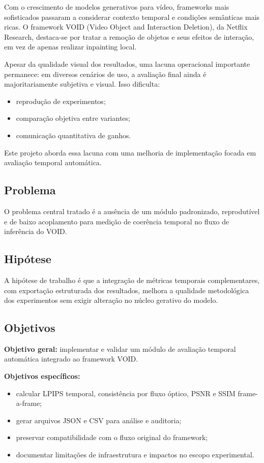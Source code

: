 \documentclass[conference]{IEEEtran}
\begin{document}
Com o crescimento de modelos generativos para vídeo, frameworks mais sofisticados passaram a considerar contexto temporal e condições semânticas mais ricas. O framework VOID (Video Object and Interaction Deletion), da Netflix Research, destaca-se por tratar a remoção de objetos e seus efeitos de interação, em vez de apenas realizar inpainting local.

Apesar da qualidade visual dos resultados, uma lacuna operacional importante permanece: em diversos cenários de uso, a avaliação final ainda é majoritariamente subjetiva e visual. Isso dificulta:
\begin{itemize}
    \item reprodução de experimentos;
    \item comparação objetiva entre variantes;
    \item comunicação quantitativa de ganhos.
\end{itemize}

Este projeto aborda essa lacuna com uma melhoria de implementação focada em avaliação temporal automática.

\subsection{Problema}
O problema central tratado é a ausência de um módulo padronizado, reprodutível e de baixo acoplamento para medição de coerência temporal no fluxo de inferência do VOID.

\subsection{Hipótese}
A hipótese de trabalho é que a integração de métricas temporais complementares, com exportação estruturada dos resultados, melhora a qualidade metodológica dos experimentos sem exigir alteração no núcleo gerativo do modelo.

\subsection{Objetivos}
\textbf{Objetivo geral:}
implementar e validar um módulo de avaliação temporal automática integrado ao framework VOID.

\textbf{Objetivos específicos:}
\begin{itemize}
    \item calcular LPIPS temporal, consistência por fluxo óptico, PSNR e SSIM frame-a-frame;
    \item gerar arquivos JSON e CSV para análise e auditoria;
    \item preservar compatibilidade com o fluxo original do framework;
    \item documentar limitações de infraestrutura e impactos no escopo experimental.
\end{itemize}
\end{document}
